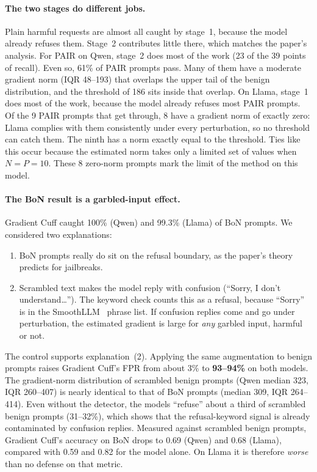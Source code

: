 \documentclass[11pt,a4paper]{article}
\begin{document}
\paragraph{The two stages do different jobs.} Plain harmful requests are almost all caught by stage~1, because the model already refuses them. Stage~2 contributes little there, which matches the paper's analysis. For PAIR on Qwen, stage~2 does most of the work (23 of the 39 points of recall). Even so, 61\% of PAIR prompts pass. Many of them have a moderate gradient norm (IQR 48--193) that overlaps the upper tail of the benign distribution, and the threshold of 186 sits inside that overlap. On Llama, stage~1 does most of the work, because the model already refuses most PAIR prompts. Of the 9 PAIR prompts that get through, 8 have a gradient norm of exactly zero: Llama complies with them consistently under every perturbation, so no threshold can catch them. The ninth has a norm exactly equal to the threshold. Ties like this occur because the estimated norm takes only a limited set of values when $N = P = 10$. These 8 zero-norm prompts mark the limit of the method on this model.

\paragraph{The BoN result is a garbled-input effect.} Gradient Cuff caught 100\% (Qwen) and 99.3\% (Llama) of BoN prompts. We considered two explanations:
\begin{enumerate}
  \item BoN prompts really do sit on the refusal boundary, as the paper's theory predicts for jailbreaks.
  \item Scrambled text makes the model reply with confusion (``Sorry, I don't understand\ldots''). The keyword check counts this as a refusal, because ``Sorry'' is in the SmoothLLM~\cite{robey2023smoothllm} phrase list. If confusion replies come and go under perturbation, the estimated gradient is large for \emph{any} garbled input, harmful or not.
\end{enumerate}

The control supports explanation~(2). Applying the same augmentation to benign prompts raises Gradient Cuff's FPR from about 3\% to \textbf{93--94\%} on both models. The gradient-norm distribution of scrambled benign prompts (Qwen median 323, IQR 260--407) is nearly identical to that of BoN prompts (median 309, IQR 264--414). Even without the detector, the models ``refuse'' about a third of scrambled benign prompts (31--32\%), which shows that the refusal-keyword signal is already contaminated by confusion replies. Measured against scrambled benign prompts, Gradient Cuff's accuracy on BoN drops to 0.69 (Qwen) and 0.68 (Llama), compared with 0.59 and 0.82 for the model alone. On Llama it is therefore \emph{worse} than no defense on that metric.
\end{document}

